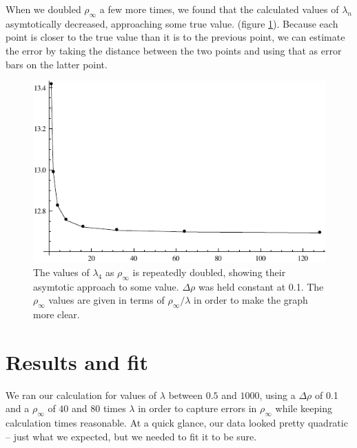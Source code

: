 \documentclass[12pt,twoside]{reedthesis}
\begin{document}
When we doubled $\rho_{\infty}$ a few more times, we found that the calculated values of $\lambda_{n}$ asymtotically decreased, approaching some true value. (figure \ref{fig:asymtote}). Because each point is closer to the true value than it is to the previous point, we can estimate the error by taking the distance between the two points and using that as error bars on the latter point.

\begin{figure}[h]
\centering
\includegraphics{Figures/asymtote}
\caption[Asymtotic behavior of $\lambda_{4} (\rho_{\infty})$]{The values of $\lambda_{4}$ as $\rho_{\infty}$ is repeatedly doubled, showing their asymtotic approach to some value. $\Delta \rho$ was held constant at 0.1. The $\rho_{\infty}$ values are given in terms of $\rho_{\infty}/\lambda$ in order to make the graph more clear.}
\label{fig:asymtote}
\end{figure} 

\section{Results and fit}
We ran our calculation for values of $\lambda$ between $0.5$ and $1000$, using a $\Delta \rho$ of 0.1 and a $\rho_{\infty}$ of $40$ and $80$ times $\lambda$ in order to capture errors in $\rho_{\infty}$ while keeping calculation times reasonable. At a quick glance, our data looked pretty quadratic -- just what we expected, but we needed to fit it to be sure.
\end{document}
